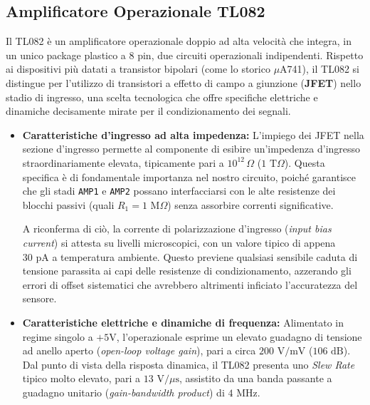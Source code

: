 \documentclass[12pt,a4paper]{article}
\begin{document}
    \subsection{Amplificatore Operazionale TL082}
        Il TL082 è un amplificatore operazionale doppio ad alta velocità che integra, in un unico package plastico a 8 pin, due circuiti operazionali 
        indipendenti. Rispetto ai dispositivi più datati a transistor bipolari (come lo storico $\mu$A741), il TL082 si distingue per l'utilizzo di 
        transistori a effetto di campo a giunzione (\textbf{JFET}) nello stadio di ingresso, una scelta tecnologica che offre specifiche elettriche e 
        dinamiche decisamente mirate per il condizionamento dei segnali.

        \begin{itemize}
            \item \textbf{Caratteristiche d'ingresso ad alta impedenza:} L'impiego dei JFET nella sezione d'ingresso permette al componente di esibire 
                un'impedenza d'ingresso straordinariamente elevata, tipicamente pari a $10^{12}\,\Omega$ ($1\text{ T}\Omega$). Questa specifica è di 
                fondamentale importanza nel nostro circuito, poiché garantisce che gli stadi \texttt{AMP1} e \texttt{AMP2} possano interfacciarsi con 
                le alte resistenze dei blocchi passivi (quali $R_1 = 1\text{ M}\Omega$) senza assorbire correnti significative. 

                A riconferma di ciò, la corrente di polarizzazione d'ingresso (\textit{input bias current}) si attesta su livelli microscopici, con un 
                valore tipico di appena $30\text{ pA}$ a temperatura ambiente. Questo previene qualsiasi sensibile caduta di tensione parassita ai capi 
                delle resistenze di condizionamento, azzerando gli errori di offset sistematici che avrebbero altrimenti inficiato l'accuratezza del sensore.
            
            \item \textbf{Caratteristiche elettriche e dinamiche di frequenza:} Alimentato in regime singolo a $+5\text{V}$, l'operazionale esprime un elevato 
                guadagno di tensione ad anello aperto (\textit{open-loop voltage gain}), pari a circa $200\text{ V/mV}$ ($106\text{ dB}$). Dal punto di vista
                della risposta dinamica, il TL082 presenta uno \textit{Slew Rate} tipico molto elevato, pari a $13\text{ V}/\mu\text{s}$, assistito da una banda 
                passante a guadagno unitario (\textit{gain-bandwidth product}) di $4\text{ MHz}$. 
            

\end{itemize}
\end{document}
